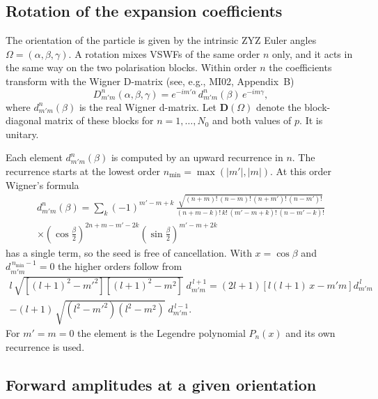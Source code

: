 \documentclass[11pt,a4paper]{article}
\begin{document}
\subsection{Rotation of the expansion coefficients}
\label{sec:wigner-rotation}

The orientation of the particle is given by the intrinsic ZYZ Euler angles $\Omega = (\alpha, \beta, \gamma)$.
A rotation mixes VSWFs of the same order $n$ only, and it acts in the same way on the two polarisation blocks.
Within order $n$ the coefficients transform with the Wigner D-matrix (see, e.g., MI02, Appendix~B)
\begin{equation}
  D^n_{m'm}(\alpha, \beta, \gamma) = e^{-i m' \alpha}\, d^n_{m'm}(\beta)\, e^{-i m \gamma},
  \label{eq:wigner-D}
\end{equation}
where $d^n_{m'm}(\beta)$ is the real Wigner d-matrix.
Let $\mathbf{D}(\Omega)$ denote the block-diagonal matrix of these blocks for $n = 1, \dots, N_0$ and both values of $p$.
It is unitary.

Each element $d^n_{m'm}(\beta)$ is computed by an upward recurrence in $n$.
The recurrence starts at the lowest order $n_\mathrm{min} = \max(|m'|, |m|)$.
At this order Wigner's formula
\begin{multline}
  d^n_{m'm}(\beta) = \sum_k (-1)^{m'-m+k}\,
  \frac{\sqrt{(n+m)!\,(n-m)!\,(n+m')!\,(n-m')!}}{(n+m-k)!\,k!\,(m'-m+k)!\,(n-m'-k)!} \\
  \times \left(\cos\frac{\beta}{2}\right)^{2n+m-m'-2k} \left(\sin\frac{\beta}{2}\right)^{m'-m+2k}
  \label{eq:wigner-formula}
\end{multline}
has a single term, so the seed is free of cancellation.
With $x = \cos\beta$ and $d^{\,n_\mathrm{min}-1}_{m'm} = 0$ the higher orders follow from
\begin{multline}
  l\,\sqrt{\left[(l+1)^2 - m'^2\right]\left[(l+1)^2 - m^2\right]}\; d^{\,l+1}_{m'm}
  = (2l+1)\left[l(l+1)\,x - m' m\right] d^{\,l}_{m'm} \\
  - (l+1)\,\sqrt{\left(l^2 - m'^2\right)\left(l^2 - m^2\right)}\; d^{\,l-1}_{m'm}.
  \label{eq:wigner-recurrence}
\end{multline}
For $m' = m = 0$ the element is the Legendre polynomial $P_n(x)$ and its own recurrence is used.

\subsection{Forward amplitudes at a given orientation}
\end{document}
